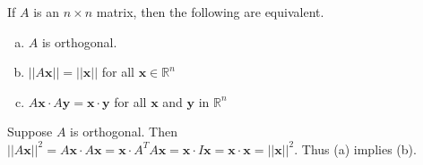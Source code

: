 \documentclass[12pt,letterpaper,reqno]{article}
\numberwithin{equation}{section}
\newcommand{\bx}{\mathbf{x}}
\newcommand{\by}{\mathbf{y}}
\newcommand{\fixme}[1]{{\color{orange}{[#1]}}}
\begin{document}
\begin{thm}
	If $A$ is an $n \times n$ matrix, then the following are equivalent.
	\begin{enumerate}[(a)]
		\item $A$ is orthogonal.
		\item $||A\bx||=||\bx||$ for all $\bx \in \mathbb{R}^n$ 
		\item $A\bx \cdot A\by = \bx \cdot \by$ for all $\bx$ and $\by$ in $\mathbb{R}^n$
	\end{enumerate}
\end{thm}
\begin{pf}
	Suppose $A$ is orthogonal. Then $||A\bx||^2=A\bx \cdot A\bx=\bx \cdot A^TA\bx=\bx \cdot I\bx =\bx \cdot \bx = ||\bx||^2$. Thus (a) implies (b). \fixme{Finish.}
\end{pf}
\end{document}
